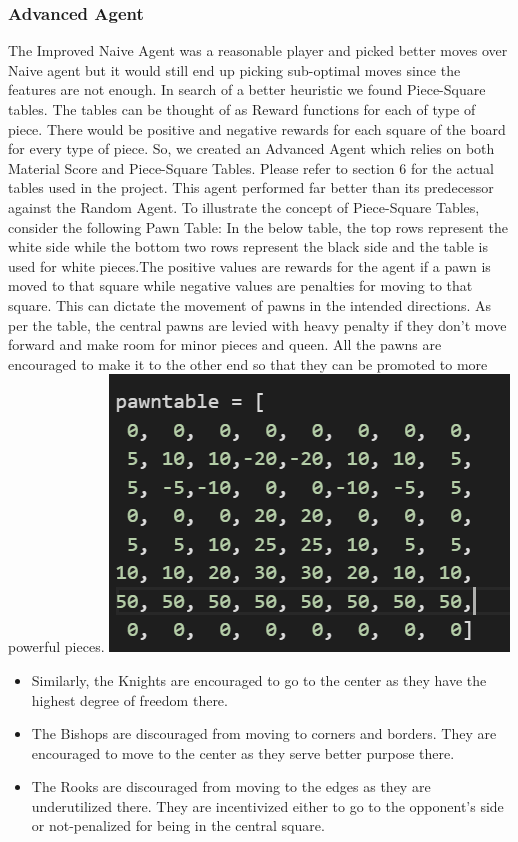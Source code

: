 \documentclass[12pt]{article}
\begin{document}
\subsubsection{Advanced Agent}
The Improved Naive Agent was a reasonable player and picked better moves over Naive agent but
it would still end up picking sub-optimal moves since the features are not enough. In search of a
better heuristic we found Piece-Square tables. The tables can be thought of as Reward functions for
each of type of piece. There would be positive and negative rewards for each square of the board
for every type of piece. So, we created an Advanced Agent which relies on both Material Score and
Piece-Square Tables. Please refer to section 6 for the actual tables used in the project. This agent
performed far better than its predecessor against the Random Agent.
To illustrate the concept of Piece-Square Tables, consider the following Pawn Table:
In the below table, the top rows represent the white side while the bottom two rows represent the
black side and the table is used for white pieces.The positive values are rewards for the agent if a
pawn is moved to that square while negative values are penalties for moving to that square. This
can dictate the movement of pawns in the intended directions. As per the table, the central pawns
are levied with heavy penalty if they don't move forward and make room for minor pieces and queen.
All the pawns are encouraged to make it to the other end so that they can be promoted to more
powerful pieces.
\includegraphics[scale=1]{./images/pawntable.PNG}
\begin{itemize}
\item Similarly, the Knights are encouraged to go to the center as they have the highest degree of
freedom there.
\item  The Bishops are discouraged from moving to corners and borders. They are encouraged to
move to the center as they serve better purpose there.
\item  The Rooks are discouraged from moving to the edges as they are underutilized there. They
are incentivized either to go to the opponent's side or not-penalized for being in the central
square.
\end{itemize}
\end{document}
